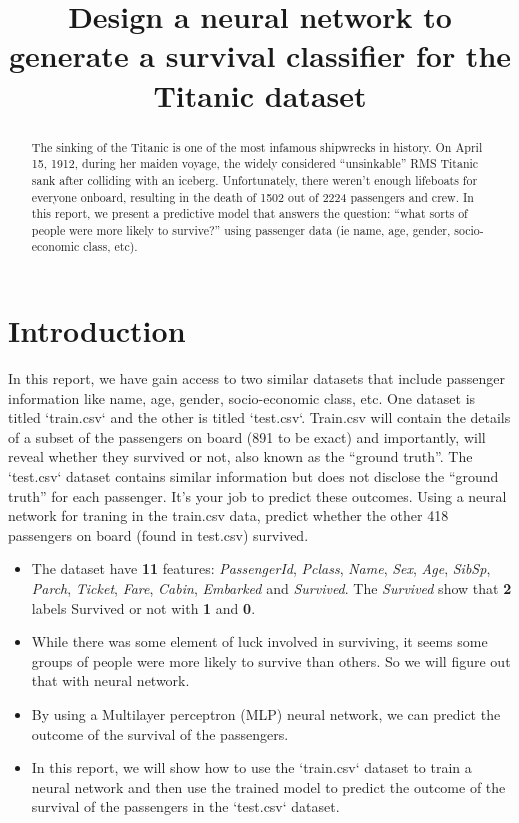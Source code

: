 \documentclass{article}
\title{Design a neural network to generate a survival classifier for the Titanic dataset}
\begin{document}
\maketitle
\begin{abstract}
    The sinking of the Titanic is one of the most infamous shipwrecks in history.
    On April 15, 1912, during her maiden voyage, the widely considered “unsinkable” RMS Titanic sank after colliding with an iceberg.
    Unfortunately, there weren’t enough lifeboats for everyone onboard, resulting in the death of 1502 out of 2224 passengers and crew.
    In this report, we present a predictive model that answers the question: “what sorts of people were more likely to survive?” using passenger data (ie name, age, gender, socio-economic class, etc).
\end{abstract}


\section{Introduction}
\label{sec:intro}
In this report, we have gain access to two similar datasets that include passenger information like name, age, gender, socio-economic class, etc. One dataset is titled `train.csv` and the other is titled `test.csv`.
Train.csv will contain the details of a subset of the passengers on board (891 to be exact) and importantly, will reveal whether they survived or not, also known as the “ground truth”.
The `test.csv` dataset contains similar information but does not disclose the “ground truth” for each passenger. It’s your job to predict these outcomes.
Using a neural network for traning in the train.csv data, predict whether the other 418 passengers on board (found in test.csv) survived.
\begin{itemize}
    \item The dataset have \textbf{11} features: \textit{PassengerId}, \textit{Pclass}, \textit{Name}, \textit{Sex}, \textit{Age}, \textit{SibSp}, \textit{Parch}, \textit{Ticket}, \textit{Fare}, \textit{Cabin}, \textit{Embarked} and \textit{Survived}.
    The \textit{Survived} show that \textbf{2} labels Survived or not with \textbf{1} and \textbf{0}.
    \item While there was some element of luck involved in surviving,
    it seems some groups of people were more likely to survive than others.
    So we will figure out that with neural network.
    \item By using a Multilayer perceptron (MLP) neural network, we can predict the outcome of the survival of the passengers.
    \item In this report, we will show how to use the `train.csv` dataset to train a neural network and then use the trained model to predict the outcome of the survival of the passengers in the `test.csv` dataset. 
\end{itemize}
\end{document}
